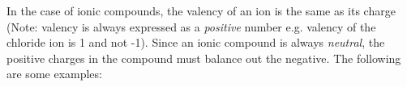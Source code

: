     \par
        \label{m38689*id144609}In the case of ionic compounds, the valency of an ion is the same as its charge (Note: valency is always expressed as a
\textsl{positive} number e.g. valency of the chloride ion is 1 and not -1). Since an ionic compound is always \textsl{neutral},
the positive charges in the compound must balance out the negative. The following are some examples:\par 
% 
% 
% 

% 
% 

